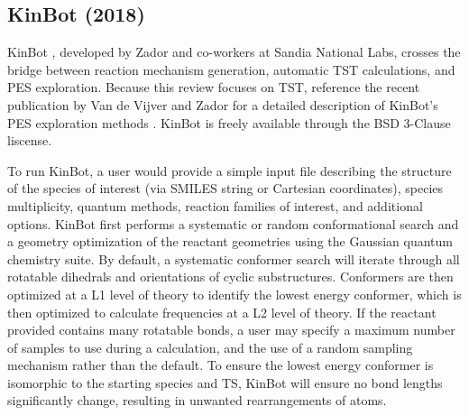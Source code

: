 \documentclass[preprint, 11pt]{elsarticle} %
\begin{document}
\subsection{KinBot (2018)}


KinBot \cite{kinbot:2018, kinbot:2019}, developed by Zador and co-workers at Sandia National Labs, crosses the bridge between reaction mechanism generation, automatic TST calculations, and PES exploration.
Because this review focuses on TST, reference the recent publication by Van de Vijver and Zador for a detailed description of KinBot's PES exploration methods \cite{kinbot:2019}.
KinBot is freely available through the BSD 3-Clause liscense.

To run KinBot, a user would provide a simple input file describing the structure of the species of interest (via SMILES string or Cartesian coordinates), species multiplicity, quantum methods, reaction families of interest, and additional options. 
KinBot first performs a systematic or random conformational search and a geometry optimization of the reactant geometries using the Gaussian quantum chemistry suite.
By default, a systematic conformer search will iterate through all rotatable dihedrals and orientations of cyclic substructures. 
Conformers are then optimized at a L1 level of theory to identify the lowest energy conformer, which is then optimized to calculate frequencies at a L2 level of theory.
If the reactant provided contains many rotatable bonds, a user may specify a maximum number of samples to use during a calculation, and the use of a random sampling mechanism rather than the default.
To ensure the lowest energy conformer is isomorphic to the starting species and TS, KinBot will ensure no bond lengths significantly change, resulting in unwanted rearrangements of atoms.
\end{document}
